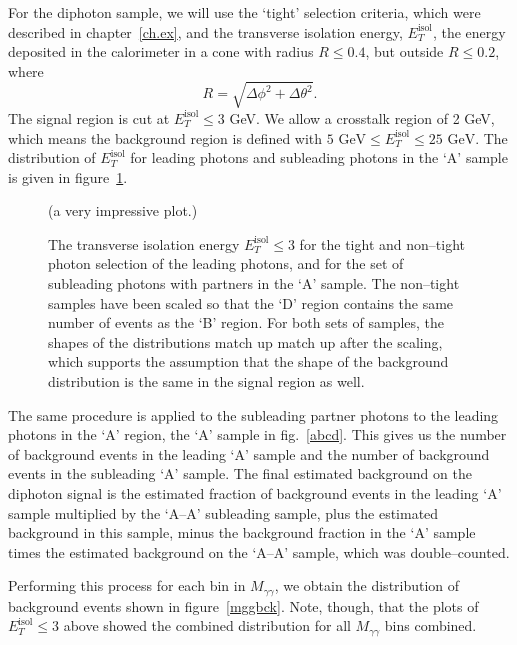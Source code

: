 For the diphoton sample, we will use the `tight' selection criteria, which were described in chapter~\ref{ch.ex}, and the transverse isolation energy, $E_T^{\text{isol}}$, the energy deposited in the calorimeter in a cone with radius $R\le0.4$, but outside $R\le0.2$, where
\[R=\sqrt{\Delta\phi^2+\Delta\theta^2}.\]
The signal region is cut at $E_T^{\text{isol}}\le3$ GeV. We allow a crosstalk region of 2 GeV, which means the background region is defined with $5\text{ GeV}\le E_T^{\text{isol}}\le25\text{ GeV}$. The distribution of $E_T^{\text{isol}}$ for leading photons and subleading photons in the `A' sample is given in figure~\ref{etiso}.

\begin{figure}[htp]
\begin{minipage}[b]{.69\textwidth}
\hspace{-1em}%
\centering (a very impressive plot.)
\end{minipage}\hfill\begin{minipage}[b]{.3\textwidth}
\caption{The transverse isolation energy $E_T^{\text{isol}}\le3$ for the tight and non--tight photon selection of the leading photons, and for the set of subleading photons with partners in the `A' sample. The non--tight samples have been scaled so that the `D' region contains the same number of events as the `B' region. For both sets of samples, the shapes of the distributions match up match up after the scaling, which supports the assumption that the shape of the background distribution is the same in the signal region as well.
\label{etiso}}
\end{minipage}
\end{figure}

The same procedure is applied to the subleading partner photons to the leading photons in the `A' region, the `A' sample in fig.~\ref{abcd}. This gives us the number of background events in the leading `A' sample and the number of background events in the subleading `A' sample. The final estimated background on the diphoton signal is the estimated fraction of background events in the leading `A' sample multiplied by the `A--A' subleading sample, plus the estimated background in this sample, minus the background fraction in the `A' sample times the estimated background on the `A--A' sample, which was double--counted.

Performing this process for each bin in $M_{\gamma\gamma}$, we obtain the distribution of background events shown in figure~\ref{mggbck}. Note, though, that the plots of $E_T^{\text{isol}}\le3$ above showed the combined distribution for all $M_{\gamma\gamma}$ bins combined.

